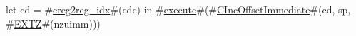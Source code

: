 let cd = #\hyperref[sailRISCVzcreg2regzyidx]{creg2reg\_idx}#(cdc) in
#\hyperref[sailRISCVzexecute]{execute}#(#\hyperref[sailRISCVzCIncOffsetImmediate]{CIncOffsetImmediate}#(cd, sp, #\hyperref[sailRISCVzEXTZ]{EXTZ}#(nzuimm)))
